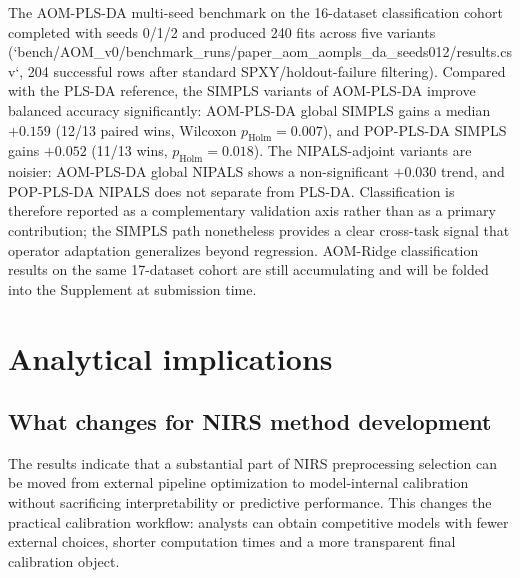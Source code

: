 \documentclass[11pt,a4paper]{article}
\begin{document}
The AOM-PLS-DA multi-seed benchmark on the 16-dataset classification cohort
completed with seeds 0/1/2 and produced 240 fits across five variants
(`bench/AOM_v0/benchmark_runs/paper_aom_aompls_da_seeds012/results.csv`,
204 successful rows after standard SPXY/holdout-failure filtering).
Compared with the PLS-DA reference, the SIMPLS variants of AOM-PLS-DA
improve balanced accuracy significantly: AOM-PLS-DA global SIMPLS gains a
median $+0.159$ (12/13 paired wins, Wilcoxon $p_\mathrm{Holm}=0.007$), and
POP-PLS-DA SIMPLS gains $+0.052$ (11/13 wins, $p_\mathrm{Holm}=0.018$).
The NIPALS-adjoint variants are noisier: AOM-PLS-DA global NIPALS shows a
non-significant $+0.030$ trend, and POP-PLS-DA NIPALS does not separate
from PLS-DA.  Classification is therefore reported as a complementary
validation axis rather than as a primary contribution; the SIMPLS path
nonetheless provides a clear cross-task signal that operator adaptation
generalizes beyond regression.  AOM-Ridge classification results on the
same 17-dataset cohort are still accumulating and will be folded into the
Supplement at submission time.

\begin{table}[t]
  \centering
  \caption{Classification summary on the 16-dataset cohort with seeds
  0/1/2 multi-seed averaging.  Positive balanced-accuracy differences
  favour the AOM or POP variant over PLS-DA.  Holm-corrected Wilcoxon
  signed-rank $p$-values are computed within the family of four AOM-PLS-DA
  vs PLS-DA comparisons.}
  \label{tab:classification_main}
  \small
  
\end{table}

\section{Analytical implications}

\subsection{What changes for NIRS method development}

The results indicate that a substantial part of NIRS preprocessing selection
can be moved from external pipeline optimization to model-internal calibration
without sacrificing interpretability or predictive performance.  This changes
the practical calibration workflow: analysts can obtain competitive models with
fewer external choices, shorter computation times and a more transparent final
calibration object.
\end{document}
